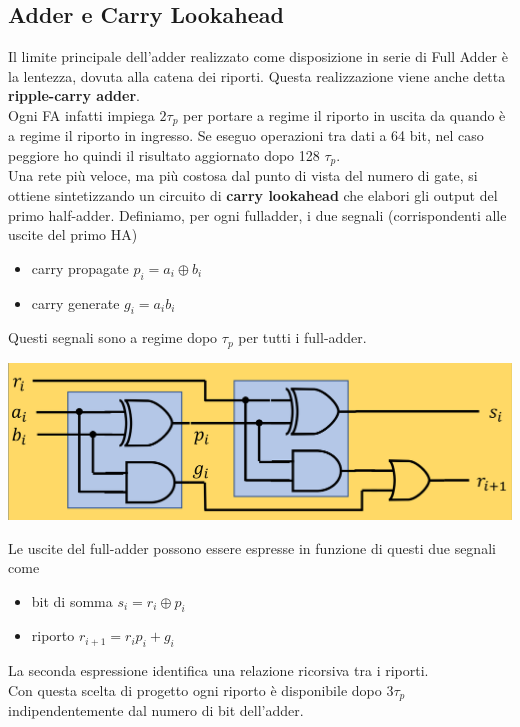 \documentclass{article}
\begin{document}
\subsection{Adder e Carry Lookahead}
Il limite principale dell’adder realizzato come disposizione in serie di Full Adder è la lentezza, dovuta alla catena dei riporti. Questa realizzazione viene anche detta \textbf{\color{cyan} ripple-carry adder}.\\
Ogni FA infatti impiega $2 \tau _p$ per portare a regime il riporto in uscita da quando è a regime il riporto in ingresso. Se eseguo operazioni tra dati a 64 bit, nel caso peggiore ho quindi il risultato aggiornato dopo 128 $\tau _p$.
\vspace{0.1cm}\\
Una rete più veloce, ma più costosa dal punto di vista del numero di gate, si ottiene sintetizzando un circuito di \textbf{\color{cyan} carry lookahead} che elabori gli output del primo half-adder. Definiamo, per ogni fulladder, i due segnali (corrispondenti alle uscite del primo HA)
\begin{itemize}
    \item carry propagate $p_i = a_i \oplus b_i$
    \item carry generate $g_i = a_ib_i$
\end{itemize}
Questi segnali sono a regime dopo $\tau _p$ per tutti i full-adder.
\begin{center}
    \includegraphics[scale=0.32]{carrylookahead1.png}
\end{center}
Le uscite del full-adder possono essere espresse in funzione di questi due segnali come
\begin{itemize}
    \item bit di somma $s_i = r_i \oplus p_i$
    \item riporto $r_{i+1} = r_ip_i + g_i$
\end{itemize}
La seconda espressione identifica una relazione ricorsiva tra i riporti.\\
Con questa scelta di progetto ogni riporto è disponibile dopo $3 \tau _p$ indipendentemente dal numero di bit dell'adder.
\end{document}
